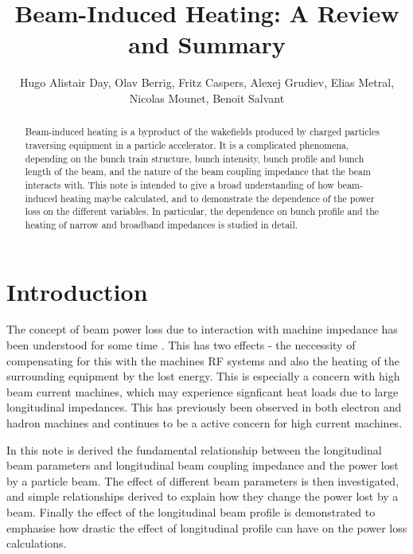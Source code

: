 \documentclass{cernyrep}
\begin{document}
\title{Beam-Induced Heating: A Review and Summary}
\author{Hugo Alistair Day, Olav Berrig, Fritz Caspers, Alexej Grudiev, Elias Metral, Nicolas Mounet, Benoit Salvant}

\maketitle


\begin{abstract}
Beam-induced heating is a byproduct of the wakefields produced by charged particles traversing equipment in a particle accelerator. It is a complicated phenomena, depending on the bunch train structure, bunch intensity, bunch profile and bunch length of the beam, and the nature of the beam coupling impedance that the beam interacts with. This note is intended to give a broad understanding of how beam-induced heating maybe calculated, and to demonstrate the dependence of the power loss on the different variables. In particular, the dependence on bunch profile and the heating of narrow and broadband impedances is studied in detail.
\end{abstract}


\section{Introduction}

The concept of beam power loss due to interaction with machine impedance has been understood for some time \cite{Chao:PhysColEff, Ng:IntDepInstab}. This has two effects - the neccessity of compensating for this with the machines RF systems and also the heating of the surrounding equipment by the lost energy. This is especially a concern with high beam current machines, which may experience signficant heat loads due to large longitudinal impedances. This has previously been observed in both electron \cite{Pivi:PEP} and hadron machines \cite{Salvant:Heating,Metral:Heating} and continues to be a active concern for high current machines. 

In this note is derived the fundamental relationship between the longitudinal beam parameters and longitudinal beam coupling impedance and the power lost by a particle beam. The effect of different beam parameters is then investigated, and simple relationships derived to explain how they change the power lost by a beam. Finally the effect of the longitudinal beam profile is demonstrated to emphasise how drastic the effect of longitudinal profile can have on the power loss calculations.
\end{document}
